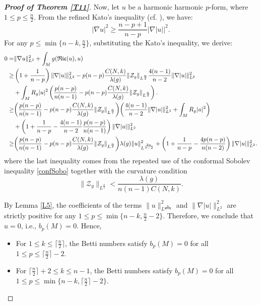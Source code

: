 \documentclass[12pt, twoside]{article}
\theoremstyle{definition}
\numberwithin{equation}{section}
\def \la {\lambda}
\def\na {\nabla}
\begin{document}
\begin{proof}[\textbf{Proof of Theorem \ref{T11}}]
Now, let $u$ be a harmonic harmonic $p$-form, where $1\leq p\leq \frac{n}{2}$. From the refined Kato's inequality (cf. \cite{CGH00}), we have:
$$|\na u|^{2}\geq \frac{n-p+1}{n-p}|\na|u||^{2}.$$
For any $p\leq\min \{n-k,\frac{n}{2}\}$, substituting the Kato's inequality, we derive:
	\begin{equation*}
	\begin{split}
	0=&\|\na u\|^{2}_{L^{2}}+\int_{M}g(\mathfrak{Ric}(u),u)\\
\geq&\left(1+\frac{1}{n-p}\right) \|\na |u|\|^{2}_{L^{2}}-p(n-p)\frac{C(N,k)}{\la(g)}\|\mathcal{Z}_{g}\|_{L^{ \frac{n}{2} }}\frac{4(n-1)}{n-2}\|\na |u|\|^{2}_{L^{2}}\\
	&+\int_{M}R_{g}|u|^{2}\left(\frac{p(n-p)}{n(n-1)}-p(n-p)\frac{C(N,k)}{\la(g)}\|\mathcal{Z}_{g}\|_{L^{ \frac{n}{2} }}\right).\\
\geq&\bigg{(}\frac{p(n-p)}{n(n-1)}-p(n-p)\frac{C(N,k)}{\la(g)}\|\mathcal{Z}_{g}\|_{L^{ \frac{n}{2} }} \bigg{)}\bigg{(}\frac{4(n-1)}{n-2}\|\na |u|\|^{2}_{L^{2}}+\int_{M}R_{g}|u|^{2}\bigg{)}\\
&+\left(1+\frac{1}{n-p}-\frac{4(n-1)}{n-2}\frac{p(n-p)}{n(n-1)}\right)\|\na |u|\|^{2}_{L^{2}}\\
\geq&\bigg{(}\frac{p(n-p)}{n(n-1)}-p(n-p)\frac{C(N,k)}{\la(g)}\|\mathcal{Z}_{g}\|_{L^{ \frac{n}{2} }}\bigg{)}\la(g)\|u\|^{2}_{L^{\frac{2n}{n-2} } }+\left(1+\frac{1}{n-p}-\frac{4p(n-p)}{n(n-2)}\right)\|\na |u|\|^{2}_{L^{2}}.  
	\end{split}
	\end{equation*}
where the last inequality comes from the repeated use of the conformal  Sobolev inequality \eqref{confSobo} together with the  curvature condition 
	$$\|\mathcal{Z}_{g}\|_{L^{ \frac{n}{2} }}<\frac{\la(g)}{n(n-1)C(N,k)}.$$
	
By Lemma \ref{L5}, the coefficients of the terms $\|u\|^{2}_{L^{\frac{2n}{n-2} } }$ and $\|\na |u|\|^{2}_{L^{2}}$ are strictly positive for any $1\leq p\leq\min \{n-k,\frac{n}{2}-2\}$. Therefore, we conclude that $u=0$, i.e., $b_{p}(M)=0$. Hence,
\begin{itemize}
	\item[(1)] For $1\leq k\leq \lceil\frac{n}{2}\rceil$, the Betti numbers satisfy
	$b_{p}(M)=0 $ for all $1\leq p\leq \lceil\frac{n}{2}\rceil-2$.
 	\item[(2)] For $ \lceil\frac{n}{2}\rceil+2\leq k\leq n-1$, the Betti numbers satisfy
 	$b_{p}(M)=0 $ for all $1\leq p\leq\min\{n-k,\lceil\frac{n}{2}\rceil-2\}$.
\end{itemize}
\end{proof}
\end{document}
